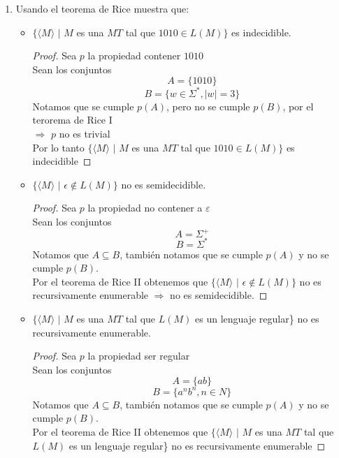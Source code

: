 \documentclass[letterpaper,10pt]{article}
\begin{document}
\begin{enumerate}
\begin{proof}
       \end{proof}
       
       \item Usando el teorema de Rice muestra que:
       \begin{itemize}
           \item $\{\langle M \rangle$ $|$ $M$ es una $MT$ tal que 
           $1010 \in L(M)\}$ es indecidible.
           \begin{proof}
           		Sea $p$ la propiedad contener $1010$\\
           		Sean los conjuntos 
           			$$A=\{ 1010 \}$$
           			$$B= \{ w \in \Sigma^* , |w| = 3 \}$$
           		Notamos que se cumple $p(A)$, pero no se cumple $p(B)$, por el terorema de Rice I\\
           			$\Rightarrow  $ $p$ no  es trivial\\
           		Por lo tanto $\{\langle M \rangle$ $|$ $M$ es una $MT$ tal que 
           		           $1010 \in L(M)\}$ es indecidible
           \end{proof}
           \item $\{\langle M \rangle$ $|$ $\epsilon \notin L(M)\}$ no es 
           semidecidible.
           \begin{proof}
           		Sea $p$ la propiedad no contener a $\varepsilon$\\
           		Sean los conjuntos 
           			$$A= \Sigma ^{+} $$
           		    $$B=  \Sigma ^* $$
           		Notamos que $A\subseteq B $, también notamos que se cumple $p(A)$ y no se cumple $p(B)$.\\
           		Por el teorema de Rice II obtenemos que $\{\langle M \rangle$ $|$ $\epsilon \notin L(M)\}$ no es recursivamente enumerable $\Rightarrow$ no es semidecidible.
           		           		
           \end{proof}
       
           \item $\{\langle M \rangle$ $|$ $M$ es una $MT$ tal que $L(M)$ es 
           un lenguaje regular\} no es recursivamente enumerable.
   			\begin{proof}
   				Sea $p$ la propiedad ser regular\\
   				Sean los conjuntos 
   					$$A=\{ ab \}$$
   				    $$B= \{ a^n b^n, n \in N \}$$
   				Notamos que $A\subseteq B $, también notamos que se cumple $p(A)$ y no se cumple $p(B)$.\\
   				Por el teorema de Rice II obtenemos que $\{\langle M \rangle$ $|$ $M$ es una $MT$ tal que $L(M)$ es un lenguaje regular\} no es recursivamente enumerable
   				           		           	
   			\end{proof}    
   	   \end{itemize}

    \end{enumerate}
\end{document}
